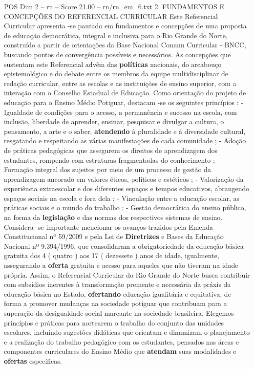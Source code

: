 \begin{textsample}{POS Dim 2 – rn – Score 21.00 – rn/rn\_em\_6.txt}  \label{ex:f2_pos_245}
2.
FUNDAMENTOS E CONCEPÇÕES DO REFERENCIAL CURRICULAR Este Referencial Curricular apresenta -se pautado em fundamentos e concepções de uma proposta de educação democrática, integral e inclusiva para o Rio Grande do Norte, construído a partir de orientações da Base Nacional Comum Curricular - BNCC, buscando pontos de convergência possíveis e necessários.
As concepções que sustentam este Referencial advêm das \textbf{políticas} nacionais, do arcabouço epistemológico e do debate entre os membros da equipe multidisciplinar de redação curricular, entre as escolas e as instituições de ensino superior, com a interação com o Conselho Estadual de Educação.
Como orientação do projeto de educação para o Ensino Médio Potiguar, destacam -se os seguintes princípios : - Igualdade de condições para o acesso, a permanência e sucesso na escola, com inclusão, liberdade de aprender, ensinar, pesquisar e divulgar a cultura, o pensamento, a arte e o saber, \textbf{atendendo} à pluralidade e à diversidade cultural, resgatando e respeitando as várias manifestações de cada comunidade ; - Adoção de práticas pedagógicas que assegurem os direitos de aprendizagem dos estudantes, rompendo com estruturas fragmentadas do conhecimento ; - Formação integral dos sujeitos por meio de um processo de gestão da aprendizagem ancorado em valores éticos, políticos e estéticos ; - Valorização da experiência extraescolar e dos diferentes espaços e tempos educativos, abrangendo espaços sociais na escola e fora dela ; - Vinculação entre a educação escolar, as práticas sociais e o mundo do trabalho ; - Gestão democrática do ensino público, na forma da \textbf{legislação} e das normas dos respectivos sistemas de ensino.
Considera -se importante mencionar os avanços trazidos pela Emenda Constitucional nº 59/2009 e pela Lei de \textbf{Diretrizes} e Bases da Educação Nacional nº 9.394/1996, que consolidaram a obrigatoriedade da educação básica gratuita dos 4 ( quatro ) aos 17 ( dezessete ) anos de idade, igualmente, assegurando a \textbf{oferta} gratuita e acesso para aqueles que não tiveram na idade própria.
Assim, o Referencial Curricular do Rio Grande do Norte busca contribuir com subsídios inerentes à transformação premente e necessária da práxis da educação básica no Estado, \textbf{ofertando} educação igualitária e equitativa, de forma a promover mudanças na sociedade potiguar que contribuam para a superação da desigualdade social marcante na sociedade brasileira.
Elegemos princípios e práticas para nortearem o trabalho do conjunto das unidades escolares, incluindo sugestões didáticas que orientam e dinamizam o planejamento e a realização do trabalho pedagógico com os estudantes, pensados nas áreas e componentes curriculares do Ensino Médio que \textbf{atendam} suas modalidades e \textbf{ofertas} específicas.

\end{textsample}
